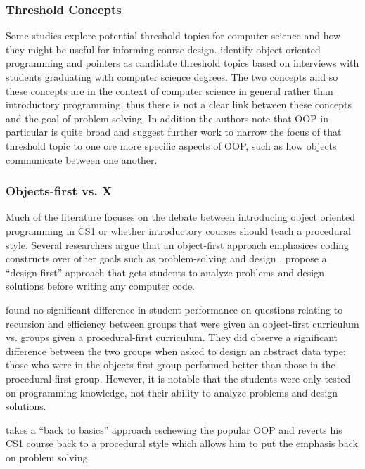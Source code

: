 \documentclass[12pt]{article}
\let\textcite=\autocite
\begin{document}

\subsubsection{Threshold Concepts}

Some studies explore potential threshold
topics\autocite{meyer_threshold_2005} for computer science and how
they might be useful for informing course
design\autocite{mccartney_liminal_2009,boustedt_threshold_2007}. \citeauthor{boustedt_threshold_2007}
identify object oriented programming and pointers as candidate
threshold topics based on interviews with students graduating with
computer science degrees. The two concepts and so these concepts are
in the context of computer science in general rather than introductory
programming, thus there is not a clear link between these concepts and
the goal of problem solving. In addition the authors note that OOP in
particular is quite broad and suggest further work to narrow the focus
of that threshold topic to one ore more specific aspects of OOP, such
as how objects communicate between one another.

\subsubsection{Objects-first vs. X}
Much of the literature focuses on the debate between introducing
object oriented programming in CS1 or whether introductory courses
should teach a procedural style. Several researchers argue that an
object-first approach emphasices coding constructs over other goals
such as problem-solving and design
\autocite{moritz_objectsfirst_2005,muller_guidelines_2005,reges_back_2006}. \textcite{moritz_objectsfirst_2005}
propose a “design-first” approach that gets students to analyze
problems and design solutions before writing any computer code.

\autocite{vilner_fundamental_2007} found no significant difference in
student performance on questions relating to recursion and efficiency
between groups that were given an object-first curriculum vs. groups
given a procedural-first curriculum. They did observe a significant
difference between the two groups when asked to design an abstract
data type: those who were in the objects-first group performed better
than those in the procedural-first group. However, it is notable that
the students were only tested on programming knowledge, not their
ability to analyze problems and design solutions.

\textcite{reges_back_2006} takes a ``back to basics'' approach eschewing
the popular OOP and reverts his CS1 course back to a procedural style
which allows him to put the emphasis back on problem solving.

\vspace{4\baselineskip}\vspace{-\parskip} %

\printbibliography
\end{document}
